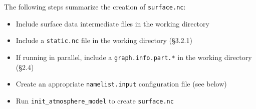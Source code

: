 The following steps summarize the creation of {\tt surface.nc}:

\begin{itemize}
\item Include surface data intermediate files in the working directory
\item Include a {\tt static.nc} file in the working directory (\S 3.2.1)
\item If running in parallel, include a {\tt graph.info.part.*} in the working directory (\S 2.4)
\item Create an appropriate {\tt namelist.input} configuration file (see below)
\item Run {\tt init\_atmosphere\_model} to create {\tt surface.nc}
\end{itemize}


\begin{longtable}{p{3.0in} |p{3.25in}}


\end{longtable}
